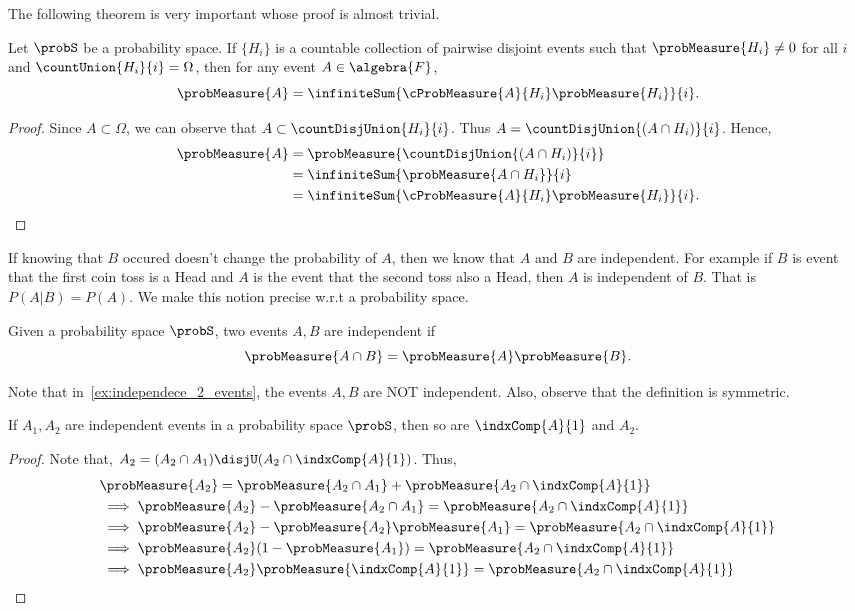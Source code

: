 The following theorem is very important whose proof is almost trivial.
\begin{Theorem}[name=Total probability theorem]\label{thm:total_prob_thm}
    Let $\probS$ be a probability space. If $\lbrace H_i \rbrace $ is a countable collection of pairwise
    disjoint events such that $\probMeasure{H_i} \neq 0$ for all $i$ and $\countUnion{H_i}{i} = \Omega$, 
    then for any event $A \in \algebra{F}$,
    \[\probMeasure{A} = \infiniteSum{\cProbMeasure{A}{H_i}\probMeasure{H_i}}{i}.\]
\end{Theorem}
\begin{proof}
    Since $A \subset \Omega$, we can observe that $ A \subset \countDisjUnion{H_i}{i}$. 
    Thus $A = \countDisjUnion{(A\cap H_i)}{i}$.
    Hence,
    \begin{align*}
	\probMeasure{A} &= \probMeasure{\countDisjUnion{(A\cap H_i)}{i}} \\
	& = \infiniteSum{\probMeasure{A\cap H_i}}{i} \\
	& = \infiniteSum{\cProbMeasure{A}{H_i}\probMeasure{H_i}}{i}.
    \end{align*}
\end{proof}
If knowing that $B$ occured doesn't change the probability of $A$, then we know that $A$ and $B$ are
independent. For example if $B$ is event that the first coin toss is a Head and $A$ is the event that the
second toss also a Head, then $A$ is independent of $B$. That is $P(A | B) = P(A)$.
We make this notion precise w.r.t a probability space.
\begin{Definition}[name=Independence of events]
    Given a probability space $\probS$, two events $A,B$ are independent if
    \[\probMeasure{A\cap B} = \probMeasure{A}\probMeasure{B}.\]
\end{Definition}
Note that in~\ref{ex:independece_2_events}, the events $A,B$ are NOT independent. Also, observe that the 
definition is symmetric.  
\begin{Proposition}
    If $A_1,A_2$ are independent events in a probability space $\probS$, then so are $\indxComp{A}{1}$ and
    $A_2$.
\end{Proposition}
\begin{proof}
    Note that, $A_2 = (A_2\cap A_1) \disjU (A_2 \cap \indxComp{A}{1})$. Thus,
    \begin{align*}
	&\probMeasure{A_2} = \probMeasure{A_2\cap A_1} + \probMeasure{A_2 \cap \indxComp{A}{1}} \\
	&\implies \probMeasure{A_2} - \probMeasure{A_2\cap A_1} = \probMeasure{A_2 \cap \indxComp{A}{1}} \\
	&\implies \probMeasure{A_2} - \probMeasure{A_2}\probMeasure{A_1} = 
	\probMeasure{A_2 \cap \indxComp{A}{1}} \\
	&\implies \probMeasure{A_2}(1 - \probMeasure{A_1}) = \probMeasure{A_2 \cap \indxComp{A}{1}} \\
	&\implies \probMeasure{A_2}\probMeasure{\indxComp{A}{1}} = \probMeasure{A_2 \cap \indxComp{A}{1}}
    \end{align*}
\end{proof}
